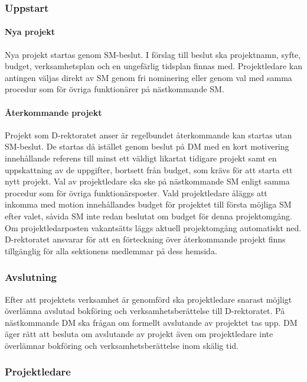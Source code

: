 \documentclass{dgovdoc}
\begin{document}
\subsubsection{Uppstart}

\paragraph{Nya projekt}

Nya projekt startas genom SM-beslut. I förslag till beslut ska projektnamn,
syfte, budget, verksamhetsplan och en ungefärlig tidsplan finnas med.
Projektledare kan antingen väljas direkt av SM genom fri nominering
eller genom val med samma procedur som för övriga funktionärer på
nästkommande SM.

\paragraph{Återkommande projekt}

Projekt som D-rektoratet anser är regelbundet återkommande kan startas
utan SM-beslut. De startas då istället genom beslut på DM med en kort
motivering innehållande referens till minst ett väldigt likartat tidigare
projekt samt en uppskattning av de uppgifter, bortsett från budget, som krävs
för att starta ett nytt projekt. Val av projektledare ska ske på nästkommande
SM enligt samma procedur som för övriga funktionärsposter. Vald projektledare
åläggs att inkomma med motion innehållandes budget för projektet till första
möjliga SM efter valet, såvida SM inte redan beslutat om budget för denna
projektomgång. Om projektledarposten vakantsätts läggs aktuell projektomgång
automatiskt ned. D-rektoratet ansvarar för att en förteckning över återkommande
projekt finns tillgänglig för alla sektionens medlemmar på dess hemsida.

\subsubsection{Avslutning}

Efter att projektets verksamhet är genomförd ska projektledare snarast möjligt
överlämna avslutad bokföring och verksamhetsberättelse till D-rektoratet.
På nästkommande DM ska frågan om formellt avslutande av projektet tas upp.
DM äger rätt att besluta om avslutande av projekt även om projektledare inte
överlämnar bokföring och verksamhetsberättelse inom skälig tid.

\subsubsection{Projektledare}
\end{document}
